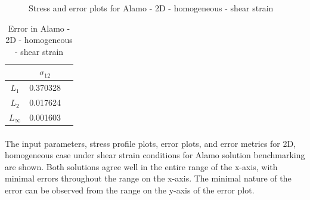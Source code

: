 \documentclass[12pt, a4paper]{report}
\begin{document}
\begin{figure}[htbp]
  \centering
  \hfill
  \caption{Stress and error plots for Alamo - 2D - homogeneous - shear strain}
\end{figure}

\begin{table}[H]
    \centering
    \begin{tabular}{|c|c|c|}
        \hline
        &\textbf{$\sigma_{12}$} \\
        \hline
        $L_1$ & 0.370328 \\
        \hline
        $L_2$ & 0.017624 \\
        \hline 
        $L_\infty$ & 0.001603 \\
        \hline
    \end{tabular}
    \caption{Error in Alamo - 2D - homogeneous - shear strain}
\end{table}

\paragraph{}
The input parameters, stress profile plots, error plots, and error metrics for 2D, homogeneous case under shear strain conditions for Alamo solution benchmarking are shown. Both solutions agree well in the entire range of the x-axis, with minimal errors throughout the range on the x-axis. The minimal nature of the error can be observed from the range on the y-axis of the error plot.
\end{document}
